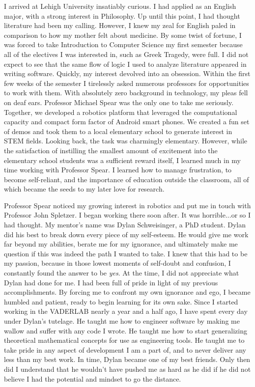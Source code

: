 \documentclass{article}
\begin{document}
I arrived at Lehigh University insatiably curious. I had applied as an English
major, with a strong interest in Philosophy.  Up until this point, I had
thought literature had been my calling. However, I knew my zeal for English
paled in comparison to how my mother felt about medicine. By some twist of
fortune, I was forced to take Introduction to Computer Science my first
semester because all of the electives I was interested in, such as Greek
Tragedy, were full. I did not expect to see that the same flow of logic I used
to analyze literature appeared in writing software. Quickly, my interest
devolved into an obsession.  Within the first few weeks of the semester I
tirelessly asked numerous professors for opportunities to work with them.  With
absolutely zero background in technology, my pleas fell on deaf ears.
Professor Michael Spear was the only one to take me seriously. Together, we
developed a robotics platform that leveraged the computational capacity and
compact form factor of Android smart phones. We created a fun set of demos and
took them to a local elementary school to generate interest in STEM fields.
Looking back, the task was charmingly elementary. However, while the
satisfaction of instilling the smallest amount of excitement into the
elementary school students was a sufficient reward itself, I learned much in my
time working with Professor Spear.  I learned how to manage frustration, to
become self-reliant, and the importance of education outside the classroom, all
of which became the seeds to my later love for research.

Professor Spear noticed my growing interest in robotics and put me in touch
with Professor John Spletzer. I began working there soon after. It was
horrible...or so I had thought. My mentor's name was Dylan Schweisinger, a PhD
student. Dylan did his best to break down every piece of my self-esteem. He
would give me work far beyond my abilities, berate me for my ignorance, and
ultimately make me question if this was indeed the path I wanted to take. I
knew that this had to be my passion, because in those lowest moments of
self-doubt and confusion, I constantly found the answer to be \emph{yes}. At
the time, I did not appreciate what Dylan had done for me. I had been full of
pride in light of my previous accomplishments. By forcing me to confront my own
ignorance and ego, I became humbled and patient, ready to begin learning for
its own sake. Since I started working in the VADERLAB nearly a year and a half
ago, I have spent every day under Dylan's tutelage.  He taught me how to
engineer software by making me wallow and suffer with any code I wrote. He
taught me how to start generalizing theoretical mathematical concepts for use
as engineering tools. He taught me to take pride in any aspect of development I
am a part of, and to never deliver any less than my best work. In time, Dylan
became one of my best friends. Only then did I understand that he wouldn't have
pushed me as hard as he did if he did not believe I had the potential and
mindset to go the distance.
\end{document}
